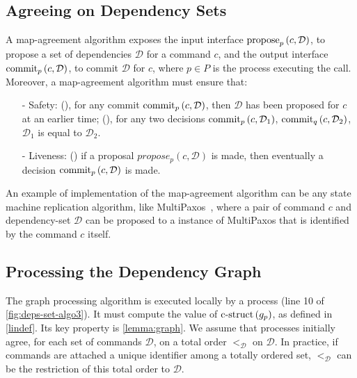 
\subsection{Agreeing on Dependency Sets}\label{map-algo}
A map-agreement algorithm exposes the input interface $\operatorname{propose}_p\left( c, \mathcal{D} \right)$, to propose a set of dependencies $\mathcal{D}$ for a command $c$, and the output interface $\operatorname{commit}_p\left( c, \mathcal{D} \right)$, to commit $\mathcal{D}$ for $c$, where $p\in P$ is the process executing the call.
Moreover, a map-agreement algorithm must ensure that: 

\begin{enumerate}
    \item[-] Safety: (), for any commit $\operatorname{commit}_p\left( c, \mathcal{D} \right)$, then $\mathcal{D}$ has been proposed for $c$ at an earlier time; (), for any two decisions $\operatorname{commit}_p\left( c, \mathcal{D}_1 \right)$, $\operatorname{commit}_q\left( c, \mathcal{D}_2 \right)$, $\mathcal{D}_1$ is equal to $\mathcal{D}_2$.  
    \item[-] Liveness: () if a proposal $propose_p\left( c,\mathcal{D} \right)$ is made, then eventually a decision $\operatorname{commit}_p\left( c, \mathcal{D} \right)$ is made.
\end{enumerate}

An example of implementation of the map-agreement algorithm can be any state machine replication algorithm, like MultiPaxos~\cite{lamport2001paxos}, where a pair of command $c$ and dependency-set $\mathcal{D}$ can be proposed to a instance of MultiPaxos that is identified by the command $c$ itself.

\subsection{Processing the Dependency Graph}
\label{abstract-algo}

The graph processing algorithm is executed locally by a process (line 10 of \cref{fig:deps-set-algo3}). It must compute the value of $\operatorname{c-struct}\left( g_p \right)$, as defined in \cref{lindef}.
Its key property is \cref{lemma:graph}. 
We assume that processes initially agree, for each set of commands $\mathcal{D}$, on a total order $<_{\mathcal{D}}$ on $\mathcal{D}$.
In practice, if commands are attached a unique identifier among a totally ordered set, $<_{\mathcal{D}}$ can be the restriction of this total order to $\mathcal{D}$.

